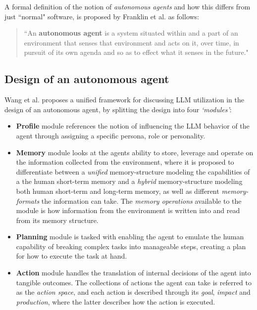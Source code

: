 A formal definition of the notion of \textit{autonomous agents} and how this differs from just ``normal" software, is proposed by Franklin et al. as follows:
\begin{quote}
    ``An \textbf{autonomous agent} is a system situated within and a part of an environment that senses that environment and acts on it, over time, in pursuit of its own agenda and so as to effect what it senses in the future."\cite{franklin1996agent}
\end{quote}

\subsection{Design of an autonomous agent}
\label{sec:BackgroundAgentDesign}
Wang et al.\cite{wang2024survey} proposes a unified framework for discussing LLM utilization in the design of an autonomous agent, by splitting the design into four \textit{`modules'}:
\begin{itemize}
    \item \textbf{Profile} module references the notion of influencing the LLM behavior of the agent through assigning a specific persona, role or personality. 
    \item \textbf{Memory} module looks at the agents ability to store, leverage and operate on the information collected from the environment, where it is proposed to differentiate between a \textit{unified} memory-structure modeling the capabilities of a the human short-term memory and a \textit{hybrid} memory-structure modeling both human short-term and long-term memory, as well as different \textit{memory-formats} the information can take. The \textit{memory operations} available to the module is how information from the environment is written into and read from its memory structure.
    \item \textbf{Planning} module is tasked with enabling the agent to emulate the human capability of breaking complex tasks into manageable steps, creating a plan for how to execute the task at hand. 
    \item \textbf{Action} module handles the translation of internal decisions of the agent into tangible outcomes. The collections of actions the agent can take is referred to as the \textit{action space}, and each action is described through its \textit{goal}, \textit{impact} and \textit{production}, where the latter describes how the action is executed.
\end{itemize}

